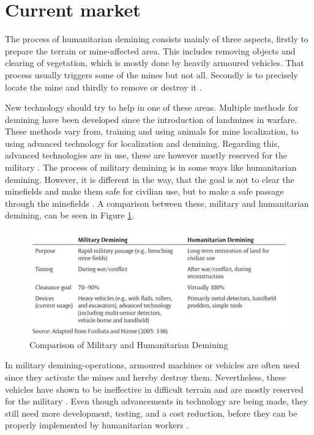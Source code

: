 \section{Current market}

The process of humanitarian demining consists mainly of three aspects, firstly to prepare the terrain or mine-affected area. This includes removing objects and clearing of vegetation, which is mostly done by heavily armoured vehicles. That process usually triggers some of the mines but not all. Secondly is to precisely locate the mine and thirdly to remove or destroy it \cite{HiddenKillers2019}.

New technology should try to help in one of these areas. Multiple methods for demining have been developed since the introduction of landmines in warfare. These methods vary from, training and using animals for mine localization, to using advanced technology for localization and demining. Regarding this, advanced technologies are in use, these are however mostly reserved for the military \cite{HiddenKillers2019}.
The process of military demining is in some ways like humanitarian demining. However, it is different in the way, that the goal is not to clear the minefields and make them safe for civilian use, but to make a safe passage through the minefields \cite{HiddenKillers2019}. A comparison between these, military and humanitarian demining, can be seen in Figure \ref{fig:military_humanitarian_demining}.

\medskip

\begin{figure}[h]
  \centering
      \includegraphics[width=1\textwidth]{00 - Images/military_humanitarian_demining.png}
  \caption{Comparison of Military and Humanitarian Demining \cite{HiddenKillers2019}}
  \label{fig:military_humanitarian_demining}
\end{figure}

In military demining-operations, armoured machines or vehicles are often used since they activate the mines and hereby destroy them. Nevertheless, these vehicles have shown to be ineffective in difficult terrain and are mostly reserved for the military \cite{6LeggedRobot2007}. Even though advancements in technology are being made, they still need more development, testing, and a cost reduction, before they can be properly implemented by humanitarian workers \cite{HiddenKillers2019}. 

